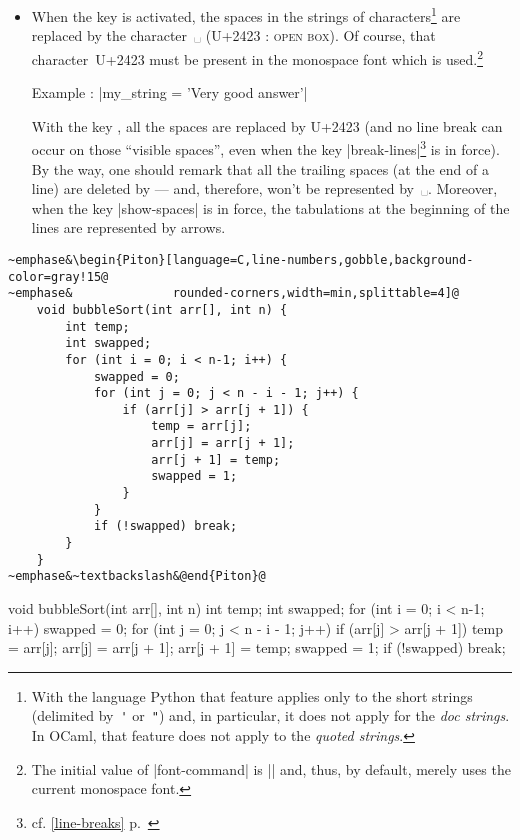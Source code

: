 \documentclass{article}
\begin{document}
\begin{itemize}
For legibility of the code, |width=min| is a shortcut for |max-width=\linewidth|.


\item {} When the key
 is activated, the spaces in the 
strings of characters\footnote{With the language Python that feature applies
only to the short strings (delimited by~\verb|'| or~\verb|"|) and, in
particular, it does not apply for the \emph{doc strings}. In OCaml, that
feature does not apply to the \emph{quoted strings}.} are replaced by the
character~␣ (U+2423 : \textsc{open box}). Of course, that character~U+2423
must be present in the monospace font which is used.\footnote{The initial
value of |font-command| is |\ttfamily| and, thus,  by default, 
merely uses the current monospace font.}

\nobreak
\begingroup
{} Example : 
\piton|my_string = 'Very good answer'| \endgroup

With the key  , all the spaces are
replaced by U+2423 (and no line break can occur on those ``visible spaces'',
even when the key |break-lines|\footnote{cf. \ref{line-breaks}
p.~\pageref{line-breaks}} is in force). By the way, one should remark that all
the trailing spaces (at the end of a line) are deleted by  --- and,
therefore, won't be represented by~␣. Moreover, when the key |show-spaces| is
in force, the tabulations at the beginning of the lines are represented by arrows.
\end{itemize}

\bigskip
\begingroup
\small
{}
\begin{Verbatim}
~emphase&\begin{Piton}[language=C,line-numbers,gobble,background-color=gray!15@
~emphase&              rounded-corners,width=min,splittable=4]@
    void bubbleSort(int arr[], int n) {
        int temp;
        int swapped;
        for (int i = 0; i < n-1; i++) {
            swapped = 0;
            for (int j = 0; j < n - i - 1; j++) {
                if (arr[j] > arr[j + 1]) {
                    temp = arr[j];
                    arr[j] = arr[j + 1];
                    arr[j + 1] = temp;
                    swapped = 1; 
                }
            }
            if (!swapped) break;
        }
    }   
~emphase&~textbackslash&@end{Piton}@
\end{Verbatim}
\endgroup

\begingroup
{}
    \begin{Piton}
    void bubbleSort(int arr[], int n) {
        int temp;
        int swapped;
        for (int i = 0; i < n-1; i++) {
            swapped = 0;
            for (int j = 0; j < n - i - 1; j++) {
                if (arr[j] > arr[j + 1]) {
                    temp = arr[j];
                    arr[j] = arr[j + 1];
                    arr[j + 1] = temp;
                    swapped = 1; 
                }
            }
            if (!swapped) break;
        }
    }   
    \end{Piton}
\endgroup
\end{document}
